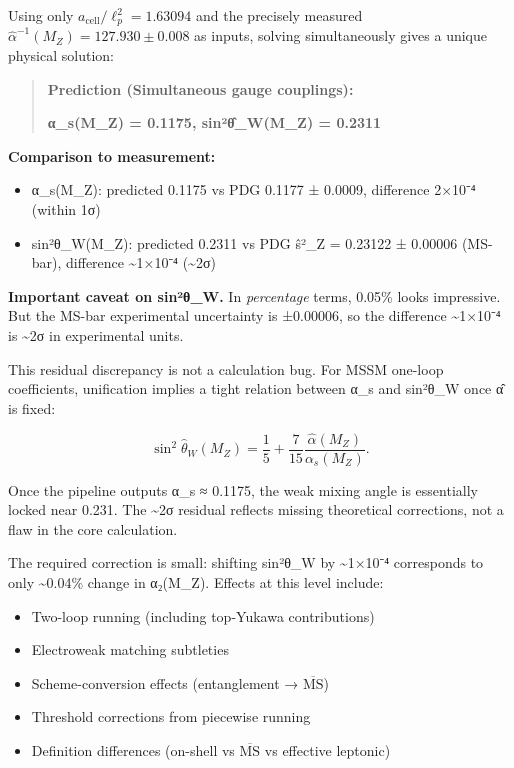 Using only \(a_{\mathrm{cell}}/\ell_p^2 = 1.63094\) and the precisely measured \(\hat{\alpha}^{-1}(M_Z) = 127.930 \pm 0.008\) as inputs, solving simultaneously gives a unique physical solution:

\begin{quote}
\textbf{Prediction (Simultaneous gauge couplings):}

\textbf{α\_s(M\_Z) = 0.1175, sin²\^{θ}\_W(M\_Z) = 0.2311}
\end{quote}

\textbf{Comparison to measurement:}

\begin{itemize}
\tightlist
\item
  α\_s(M\_Z): predicted 0.1175 vs PDG 0.1177 ± 0.0009, difference 2×10⁻⁴ (within 1σ)
\item
  sin²θ\_W(M\_Z): predicted 0.2311 vs PDG \^{s}²\_Z = 0.23122 ± 0.00006 (MS-bar), difference \textasciitilde1×10⁻⁴ (\textasciitilde2σ)
\end{itemize}

\textbf{Important caveat on sin²θ\_W.} In \emph{percentage} terms, 0.05\% looks impressive. But the MS-bar experimental uncertainty is ±0.00006, so the difference \textasciitilde1×10⁻⁴ is \textasciitilde2σ in experimental units.

This residual discrepancy is not a calculation bug. For MSSM one-loop coefficients, unification implies a tight relation between α\_s and sin²θ\_W once \^{α} is fixed:

\[
\sin^2\hat{\theta}_W(M_Z) = \frac{1}{5} + \frac{7}{15}\frac{\hat{\alpha}(M_Z)}{\alpha_s(M_Z)}.
\]

Once the pipeline outputs α\_s ≈ 0.1175, the weak mixing angle is essentially locked near 0.231. The \textasciitilde2σ residual reflects missing theoretical corrections, not a flaw in the core calculation.

The required correction is small: shifting sin²θ\_W by \textasciitilde1×10⁻⁴ corresponds to only \textasciitilde0.04\% change in α₂(M\_Z). Effects at this level include:

\begin{itemize}
\tightlist
\item
  Two-loop running (including top-Yukawa contributions)
\item
  Electroweak matching subtleties
\item
  Scheme-conversion effects (entanglement → \(\overline{\text{MS}}\))
\item
  Threshold corrections from piecewise running
\item
  Definition differences (on-shell vs \(\overline{\text{MS}}\) vs effective leptonic)
\end{itemize}

